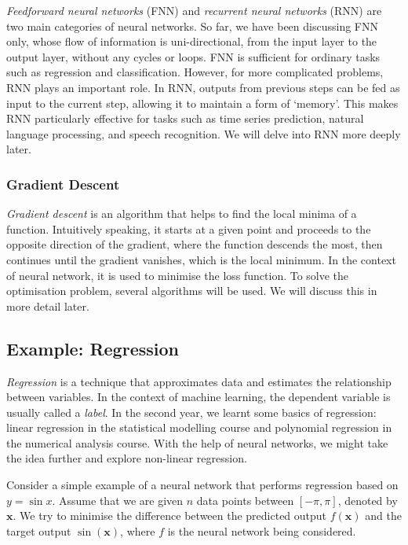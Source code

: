 \documentclass[a4paper,11pt, titlepage]{article}
\theoremstyle{definition}
\theoremstyle{plain}
\theoremstyle{remark}
\begin{document}
\textit{Feedforward neural networks} (FNN) and \textit{recurrent neural networks} (RNN) are two main categories of neural networks. So far, we have been discussing FNN only, whose flow of information is uni-directional, from the input layer to the output layer, without any cycles or loops. FNN is sufficient for ordinary tasks such as regression and classification. However, for more complicated problems, RNN plays an important role. In RNN, outputs from previous steps can be fed as input to the current step, allowing it to maintain a form of ‘memory’. This makes RNN particularly effective for tasks such as time series prediction, natural language processing, and speech recognition. We will delve into RNN more deeply later.

\subsubsection{Gradient Descent}

\textit{Gradient descent} is an algorithm that helps to find the local minima of a function. Intuitively speaking, it starts at a given point and proceeds to the opposite direction of the gradient, where the function descends the most, then continues until the gradient vanishes, which is the local minimum. In the context of neural network, it is used to minimise the loss function. To solve the optimisation problem, several algorithms will be used. We will discuss this in more detail later.

\subsection{Example: Regression}

\textit{Regression} is a technique that approximates data and estimates the relationship between variables. In the context of machine learning, the dependent variable is usually called a \textit{label}. In the second year, we learnt some basics of regression: linear regression in the statistical modelling course and polynomial regression in the numerical analysis course. With the help of neural networks, we might take the idea further and explore non-linear regression.

Consider a simple example of a neural network that performs regression based on $y = \sin x$. Assume that we are given $n$ data points between $[-\pi, \pi]$, denoted by $\mathbf{x}$. We try to minimise the difference between the predicted output $f(\mathbf{x})$ and the target output $\sin (\mathbf{x})$, where $f$ is the neural network being considered.
\end{document}
